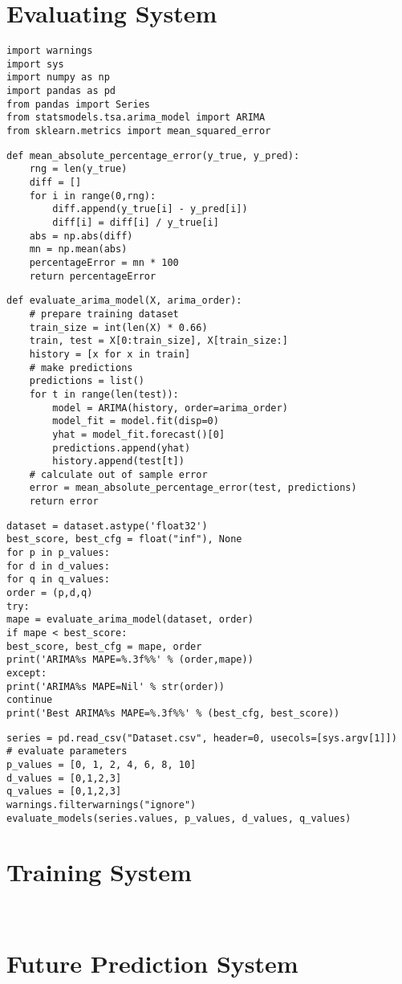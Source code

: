 

\section{Evaluating System}
\begin{lstlisting}
import warnings
import sys
import numpy as np
import pandas as pd
from pandas import Series
from statsmodels.tsa.arima_model import ARIMA
from sklearn.metrics import mean_squared_error
\end{lstlisting}

\begin{lstlisting}
def mean_absolute_percentage_error(y_true, y_pred): 
	rng = len(y_true)
	diff = []
	for i in range(0,rng):
		diff.append(y_true[i] - y_pred[i])
		diff[i] = diff[i] / y_true[i]
	abs = np.abs(diff)
	mn = np.mean(abs)
	percentageError = mn * 100
	return percentageError
\end{lstlisting}    

\begin{lstlisting}
def evaluate_arima_model(X, arima_order):
	# prepare training dataset
	train_size = int(len(X) * 0.66)
	train, test = X[0:train_size], X[train_size:]
	history = [x for x in train]
	# make predictions
	predictions = list()
	for t in range(len(test)):
		model = ARIMA(history, order=arima_order)
		model_fit = model.fit(disp=0)
		yhat = model_fit.forecast()[0]
		predictions.append(yhat)
		history.append(test[t])
	# calculate out of sample error
	error = mean_absolute_percentage_error(test, predictions)
	return error
\end{lstlisting}

\begin{lstlisting}
dataset = dataset.astype('float32')
best_score, best_cfg = float("inf"), None
for p in p_values:
for d in d_values:
for q in q_values:
order = (p,d,q)
try:
mape = evaluate_arima_model(dataset, order)
if mape < best_score:
best_score, best_cfg = mape, order
print('ARIMA%s MAPE=%.3f%%' % (order,mape))
except:
print('ARIMA%s MAPE=Nil' % str(order))
continue
print('Best ARIMA%s MAPE=%.3f%%' % (best_cfg, best_score))
\end{lstlisting}

\begin{lstlisting}
series = pd.read_csv("Dataset.csv", header=0, usecols=[sys.argv[1]])
# evaluate parameters
p_values = [0, 1, 2, 4, 6, 8, 10]
d_values = [0,1,2,3]
q_values = [0,1,2,3]
warnings.filterwarnings("ignore")
evaluate_models(series.values, p_values, d_values, q_values)
\end{lstlisting}

\section{Training System}
\begin{lstlisting}


\end{lstlisting}

\section{Future Prediction System}
\begin{lstlisting}


\end{lstlisting}